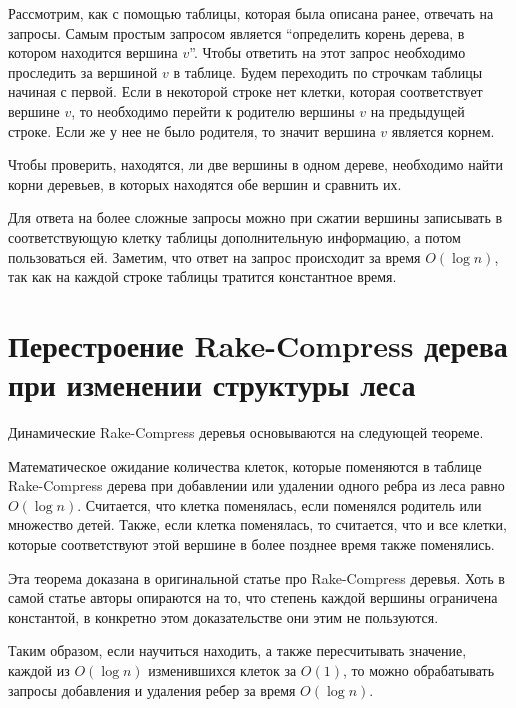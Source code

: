 Рассмотрим, как с помощью таблицы, которая была описана ранее, отвечать на запросы. Самым простым запросом является ``определить корень дерева, в котором находится вершина $v$''.
Чтобы ответить на этот запрос необходимо проследить за вершиной $v$ в таблице. Будем переходить по строчкам таблицы начиная с первой. Если в некоторой строке нет клетки,
которая соответствует вершине $v$, то необходимо перейти к родителю вершины $v$ на предыдущей строке. Если же у нее не было родителя, то значит вершина $v$ является корнем.

Чтобы проверить, находятся, ли две вершины в одном дереве, необходимо найти корни деревьев, в которых находятся обе вершин и сравнить их.

Для ответа на более сложные запросы можно при сжатии вершины записывать в соответствующую клетку таблицы дополнительную информацию, а потом пользоваться ей. 
Заметим, что ответ на запрос происходит за время $O(\log n)$, так как на каждой строке таблицы тратится константное время.


\FloatBarrier
\section{Перестроение Rake-Compress дерева при изменении структуры леса}

Динамические Rake-Compress деревья основываются на следующей теореме.                                          

\begin{theorem}
Математическое ожидание количества клеток, которые поменяются в таблице Rake-Compress дерева при добавлении или удалении одного ребра из леса равно $O(\log n)$. 
Считается, что клетка поменялась, если поменялся родитель или множество детей.
Также, если клетка поменялась, то считается, что и все клетки, которые соответствуют этой вершине в более позднее время также поменялись.
\end{theorem}

Эта теорема доказана в оригинальной статье \cite{acar04} про Rake-Compress деревья. 
Хоть в самой статье авторы опираются на то, что степень каждой вершины ограничена константой, в конкретно этом доказательстве они этим не пользуются.

Таким образом, если научиться находить, а также пересчитывать значение, каждой из $O(\log n)$ изменившихся клеток за $O(1)$, то можно обрабатывать запросы добавления и удаления ребер за время $O(\log n)$.

\FloatBarrier
